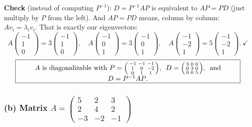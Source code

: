 \documentclass[a4paper,12pt]{article}
\begin{document}
\textbf{Check} (instead of computing $P^{-1}$): $D = P^{-1}AP$ is equivalent to $AP = PD$ (just multiply by $P$ from the left). And $AP = PD$ means, column by column: $A v_i = \lambda_i v_i$. That is exactly our eigenvectors:
\[
A\begin{pmatrix}-1\\1\\0\end{pmatrix} = 3\begin{pmatrix}-1\\1\\0\end{pmatrix},\quad
A\begin{pmatrix}-1\\0\\1\end{pmatrix} = 3\begin{pmatrix}-1\\0\\1\end{pmatrix},\quad
A\begin{pmatrix}-1\\-2\\1\end{pmatrix} = 5\begin{pmatrix}-1\\-2\\1\end{pmatrix}. \ \checkmark
\]
\[
\fbox{\parbox{0.93\textwidth}{\centering
$A$ is diagonalizable with
$P = \left(\begin{smallmatrix} -1 & -1 & -1 \\ 1 & 0 & -2 \\ 0 & 1 & 1 \end{smallmatrix}\right)$,
$\ D = \left(\begin{smallmatrix} 3 & 0 & 0 \\ 0 & 3 & 0 \\ 0 & 0 & 5 \end{smallmatrix}\right)$,
\ and $D = P^{-1}AP$.
}}
\]

\subsubsection*{(b) Matrix $A = \left(\begin{smallmatrix} 5 & 2 & 3 \\ 2 & 4 & 2 \\ -3 & -2 & -1 \end{smallmatrix}\right)$}
\end{document}
